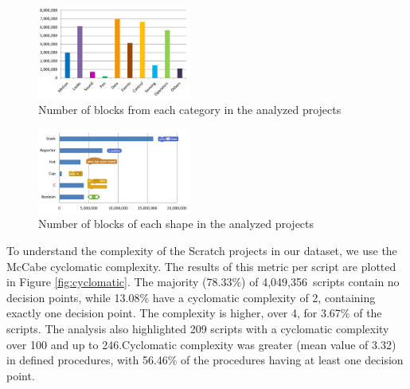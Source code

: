 \documentclass{sig-alternate}
\newcommand{\nscripts}{4,049,356}
\begin{document}
\begin{figure}
	\centering
	\includegraphics[width=0.45\textwidth]{fig/charts/16Categories}
	\vspace{-1em}
	\caption{Number of blocks from each category in the analyzed projects}
	\label{fig:categories}
\end{figure}
\begin{figure}
	\centering
	\includegraphics[width=0.45\textwidth]{fig/charts/16Shapes}
	\vspace{-1em}
	\caption{Number of blocks of each shape in the analyzed projects}
	\label{fig:shapes}
\end{figure}

To understand the complexity of the Scratch projects in our dataset, we use the McCabe cyclomatic complexity. The results of this metric per script are plotted in Figure \ref{fig:cyclomatic}. The majority (78.33\%) of \nscripts~scripts contain no decision points, while 13.08\% have a cyclomatic complexity of 2, containing exactly one decision point. The complexity is higher, over 4, for 3.67\% of the scripts. The analysis also highlighted 209 scripts with a cyclomatic complexity over 100 and up to 246.\footnotemark[\ref{repo}] Cyclomatic complexity was greater (mean value of 3.32) in defined procedures, with 56.46\% of the procedures having at least one decision point.

\noindent
{}
\end{document}
